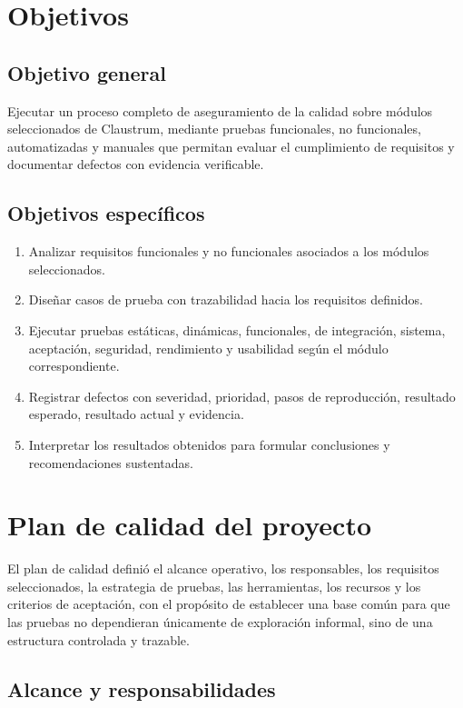 \documentclass[11pt,spanish]{article}
\begin{document}
\section{Objetivos}

\subsection{Objetivo general}

Ejecutar un proceso completo de aseguramiento de la calidad sobre módulos seleccionados de Claustrum, mediante pruebas funcionales, no funcionales, automatizadas y manuales que permitan evaluar el cumplimiento de requisitos y documentar defectos con evidencia verificable.

\subsection{Objetivos específicos}

\begin{enumerate}[label=\arabic*.]
    \item Analizar requisitos funcionales y no funcionales asociados a los módulos seleccionados.
    \item Diseñar casos de prueba con trazabilidad hacia los requisitos definidos.
    \item Ejecutar pruebas estáticas, dinámicas, funcionales, de integración, sistema, aceptación, seguridad, rendimiento y usabilidad según el módulo correspondiente.
    \item Registrar defectos con severidad, prioridad, pasos de reproducción, resultado esperado, resultado actual y evidencia.
    \item Interpretar los resultados obtenidos para formular conclusiones y recomendaciones sustentadas.
\end{enumerate}

\section{Plan de calidad del proyecto}

El plan de calidad definió el alcance operativo, los responsables, los requisitos seleccionados, la estrategia de pruebas, las herramientas, los recursos y los criterios de aceptación, con el propósito de establecer una base común para que las pruebas no dependieran únicamente de exploración informal, sino de una estructura controlada y trazable.

\subsection{Alcance y responsabilidades}
\end{document}
